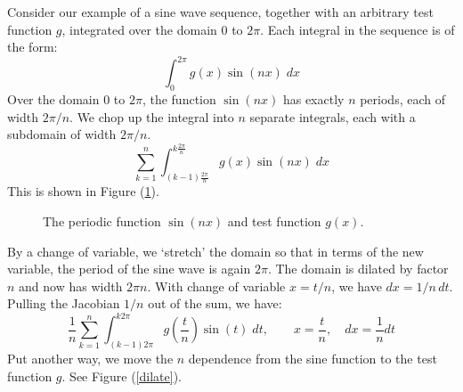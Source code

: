 \documentclass[12pt, a4paper, twoside, openright]{book}
\begin{document}
Consider our example of a sine wave sequence, together with an arbitrary test function $g$, integrated over the domain $0$ to $2 \pi$.
Each integral in the sequence is of the form:
\begin{equation}
\int_0^{2\pi} g(x) \sin(nx) \;dx
\end{equation}
Over the domain $0$ to $2\pi$, the function $\sin(nx)$ has exactly $n$ periods, each of width $2\pi /n$.
We chop up the integral into $n$ separate integrals, each with a subdomain of width $2\pi/n$.
\begin{equation}
\sum_{k=1}^n  \int_{(k-1) \frac{2\pi}{n}}^{k \frac{2\pi}{n}} g(x) \sin(nx) \;dx
\end{equation}
This is shown in Figure (\ref{sineg}).
\begin{figure}[ht]
\centering
{}
\caption{The periodic function $\sin (nx) $ and test function $g(x)$.}\label{sineg}
\end{figure}

\clearpage
By a change of variable, we `stretch' the domain so that in terms of the new variable, the period of the sine wave is again $2\pi$.  The domain is dilated by factor $n$ and now has width $2\pi n$. 
With change of variable $x = t/n$, we have $dx = 1/n \,dt$.  Pulling the Jacobian $1/n$ out of the sum, we have:
\begin{equation}
\frac{1}{n} \sum_{k=1}^n  \int_{(k-1) 2\pi}^{k 2\pi} g \left(\frac{t}{n} \right) \sin(t) \;dt 
, \qquad x = \frac{t}{n}, \quad dx = \frac{1}{n} dt
\end{equation}
Put another way, we move the $n$ dependence from the sine function to the test function $g$.  See Figure (\ref{dilate}).
\end{document}
